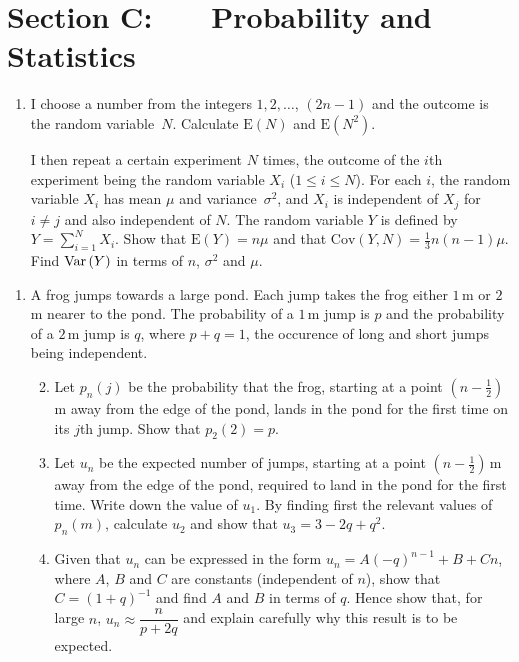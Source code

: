 \documentclass[a4, 11pt]{report}
\newlength{\qspace}
\newcounter{qnumber}
\newenvironment{question}%
 {\vspace{\qspace}
  \begin{enumerate}[\bfseries 1\quad][10]%
    \setcounter{enumi}{\value{qnumber}}%
    \item%
 }
{
  \end{enumerate}
  \filbreak
  \stepcounter{qnumber}
 }
\newenvironment{questionparts}[1][1]%
 {
  \begin{enumerate}[\bfseries (i)]%
    \setcounter{enumii}{#1}
    \addtocounter{enumii}{-1}
    \setlength{\itemsep}{5mm}
    \setlength{\parskip}{8pt}
 }
 {
  \end{enumerate}
 }
\def\E{{\mathrm E}}
\def\le{\leqslant}
\def\var{{\rm Var}\,}
\begin{document}
	
	\newpage
\section*{Section C: \ \ \ Probability and Statistics}


\begin{question}
I choose a number from the integers $1, 2, \ldots$, $(2n-1)$ and
the outcome is the random variable~$N$. Calculate $ \E(N)$ and $\E(N^2)$.

I then  repeat a certain experiment $N$ times, the outcome of the 
$i$th experiment being the random variable $X_i$ ($1\le i \le
N$). For each $i$,
the random variable $X_i$ has mean $\mu$ and variance~$\sigma^2$, and 
$X_i$ is independent of $X_j$ for $i\ne j$ and also independent of $N$.
The random variable $Y$ is defined by $Y= \sum\limits_{i=1}^NX_i$.
Show that $\E(Y)=n\mu$ and that $\mathrm{Cov}(Y,N) = \frac13n(n-1)\mu$. Find 
$\var(Y) $ in terms of $n$, $\sigma^2$ and $\mu$.
\end{question}

\begin{question}
A frog  jumps towards a large pond.
  Each jump takes the frog either $1\,$m or $2\,$m nearer to the pond.
The probability of a $1\,$m jump is $p$ and the probability of a
$2\,$m jump is
$q$, where $p+q=1$, the occurence of long and short jumps being 
independent.

\begin{questionparts}
\item
Let $p_n(j)$ be the probability that the frog,
 starting at a point
$(n-\frac12)\,$m away from 
the edge of the pond,
 lands in the pond
for the first time on its $j$th jump.
Show that $p_2(2)=p$.

\item Let $u_n$ be the expected number of jumps,
 starting at a point
$(n-\frac12)\,$m away from 
the edge of the pond,
 required to land in the pond
for the first time. Write down the value of $u_1$.
 By finding first
the relevant values of $p_n(m)$, calculate $u_2$ and show that $u_3=
3-2q+q^2$.

\item
Given that $u_n$ can be expressed in the form $u_n= A(-q)^{n-1} +B +Cn$,
where $A$, $B$ and $C$ are constants
(independent of $n$), show that
 $C= (1+q)^{-1}$ and find $A$ and $B$ in terms of  $q$.
Hence show that, for large $n$, $u_n \approx \dfrac n{p+2q}$ and 
explain carefully why this result is to be expected.
 \end{questionparts}
\end{question}
\end{document}
